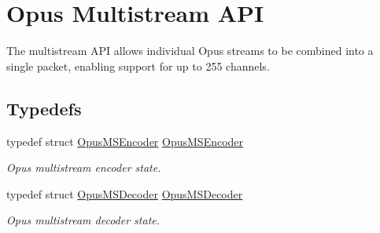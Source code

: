 \hypertarget{group__opus__multistream}{
\section{Opus Multistream API}
\label{group__opus__multistream}
}


The multistream API allows individual Opus streams to be combined into a single packet, enabling support for up to 255 channels.  
\subsection*{Typedefs}
\begin{DoxyCompactItemize}
\item 
typedef struct \hyperlink{group__opus__multistream_gae5826674d142fc873ebc1d781c507dd7}{OpusMSEncoder} \hyperlink{group__opus__multistream_gae5826674d142fc873ebc1d781c507dd7}{OpusMSEncoder}
\begin{DoxyCompactList}\small\item\em Opus multistream encoder state. \item\end{DoxyCompactList}\item 
typedef struct \hyperlink{group__opus__multistream_gad3497495deb9a8ace82e76cd4f93e0e4}{OpusMSDecoder} \hyperlink{group__opus__multistream_gad3497495deb9a8ace82e76cd4f93e0e4}{OpusMSDecoder}
\begin{DoxyCompactList}\small\item\em Opus multistream decoder state. \item\end{DoxyCompactList}\end{DoxyCompactItemize}
